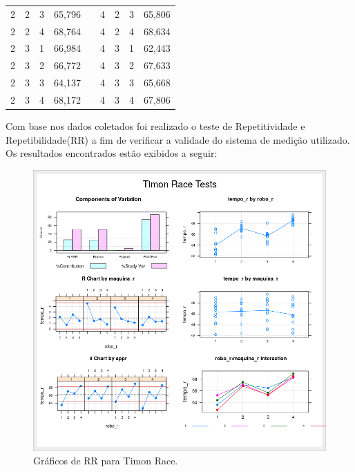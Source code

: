 \begin{table}[H]
\begin{tabular}{|c|c|c|c|lc|c|c|c|}
    2 & 2 & 3 & 65,796 & \multicolumn{1}{l|}{} & 4 & 2 & 3 & 65,806 \\ \cline{1-4} \cline{6-9} 
    \cellcolor[HTML]{C0C0C0}2 & \cellcolor[HTML]{C0C0C0}2 & \cellcolor[HTML]{C0C0C0}4 & \cellcolor[HTML]{C0C0C0}68,764 & \multicolumn{1}{l|}{} & \cellcolor[HTML]{C0C0C0}4 & \cellcolor[HTML]{C0C0C0}2 & \cellcolor[HTML]{C0C0C0}4 & \cellcolor[HTML]{C0C0C0}68,634 \\ \cline{1-4} \cline{6-9} 
    2 & 3 & 1 & 66,984 & \multicolumn{1}{l|}{} & 4 & 3 & 1 & 62,443 \\ \cline{1-4} \cline{6-9} 
    \cellcolor[HTML]{C0C0C0}2 & \cellcolor[HTML]{C0C0C0}3 & \cellcolor[HTML]{C0C0C0}2 & \cellcolor[HTML]{C0C0C0}66,772 & \multicolumn{1}{l|}{} & \cellcolor[HTML]{C0C0C0}4 & \cellcolor[HTML]{C0C0C0}3 & \cellcolor[HTML]{C0C0C0}2 & \cellcolor[HTML]{C0C0C0}67,633 \\ \cline{1-4} \cline{6-9} 
    2 & 3 & 3 & 64,137 & \multicolumn{1}{l|}{} & 4 & 3 & 3 & 65,668 \\ \cline{1-4} \cline{6-9} 
    \cellcolor[HTML]{C0C0C0}2 & \cellcolor[HTML]{C0C0C0}3 & \cellcolor[HTML]{C0C0C0}4 & \cellcolor[HTML]{C0C0C0}68,172 & \multicolumn{1}{l|}{} & \cellcolor[HTML]{C0C0C0}4 & \cellcolor[HTML]{C0C0C0}3 & \cellcolor[HTML]{C0C0C0}4 & \cellcolor[HTML]{C0C0C0}67,806 \\ \cline{1-4} \cline{6-9} 
    \end{tabular}
    \end{table}


    Com base nos dados coletados foi realizado o teste de Repetitividade e Repetibilidade(RR) a fim de verificar a validade do sistema de medição utilizado. Os resultados encontrados estão exibidos a seguir:


\begin{figure}[H]
    \label{fig:timon_tests}
    \centering
    \caption{Gráficos de RR para Timon Race.}
    \includegraphics[scale=0.8]{images/timon_race_tests.png}
\end{figure}

